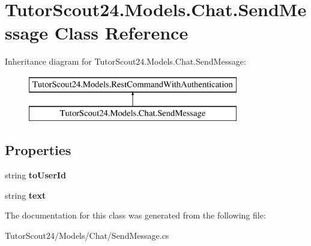 \hypertarget{class_tutor_scout24_1_1_models_1_1_chat_1_1_send_message}{}\section{Tutor\+Scout24.\+Models.\+Chat.\+Send\+Message Class Reference}
\label{class_tutor_scout24_1_1_models_1_1_chat_1_1_send_message}
Inheritance diagram for Tutor\+Scout24.\+Models.\+Chat.\+Send\+Message\+:\begin{figure}[H]
\begin{center}
\leavevmode
\includegraphics[height=2.000000cm]{class_tutor_scout24_1_1_models_1_1_chat_1_1_send_message}
\end{center}
\end{figure}
\subsection*{Properties}
\begin{DoxyCompactItemize}
\item 
\mbox{\label{class_tutor_scout24_1_1_models_1_1_chat_1_1_send_message_a515395d90a8ece1a8a01c0c95c06cd51}} 
string {\bfseries to\+User\+Id}
\item 
\mbox{\label{class_tutor_scout24_1_1_models_1_1_chat_1_1_send_message_a620d64f3671cf47d0fe38184d5ed04d0}} 
string {\bfseries text}
\end{DoxyCompactItemize}


The documentation for this class was generated from the following file\+:\begin{DoxyCompactItemize}
\item 
Tutor\+Scout24/\+Models/\+Chat/Send\+Message.\+cs\end{DoxyCompactItemize}

